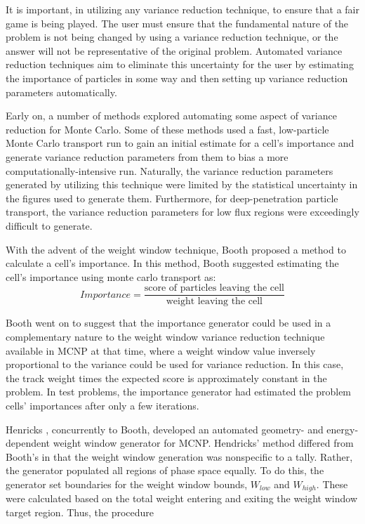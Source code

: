 It is important, in utilizing any variance reduction technique, to ensure that a fair game
is being played. The user must ensure that the fundamental nature of the problem is not 
being changed by using a variance reduction technique, or the answer will not be 
representative of the original problem. Automated variance reduction techniques aim to 
eliminate this uncertainty for the user by estimating the importance of particles in some
 way and then setting up variance reduction parameters automatically. 

Early on, a number of methods explored automating some aspect of variance reduction for 
Monte Carlo. Some of these methods used a fast, low-particle Monte Carlo transport run to gain an initial estimate for a cell's importance and generate variance reduction parameters from them to bias a more computationally-intensive run. Naturally, the variance reduction parameters generated by utilizing this technique were limited by the statistical uncertainty in the figures used to generate them. Furthermore, for deep-penetration particle transport, the variance reduction parameters for low flux regions were exceedingly difficult to generate.  

With the advent of the weight window technique, Booth \cite{booth_automatic_1982} proposed 
a method to calculate a cell's importance. In this method, Booth suggested estimating the cell's importance using monte carlo transport as:
\begin{equation}
Importance  = \frac{\text{score of particles leaving the cell}}{\text{weight leaving the cell}} 
\end{equation}
\label{eq:BoothImp}

Booth went on to suggest that the importance generator could be used in a complementary nature to the weight window variance reduction technique available in MCNP at that time, where a weight window value inversely proportional to the variance could be used for variance reduction.
In this case, the track weight times the expected score is approximately constant in the problem. 
In test problems, the importance generator had estimated the problem cells' importances after only a few iterations. 

Henricks \cite{hendricks_code-generated_1982}, concurrently to Booth, developed an automated geometry- and energy-dependent weight window generator for MCNP. 
Hendricks' method differed from Booth's in that the weight window generation was nonspecific to a tally. 
Rather, the generator populated all regions of phase space equally. 
To do this, the generator set boundaries for the weight window bounds, $W_{low}$ and $W_{high}$. These were calculated based on the total weight entering and exiting the weight window target region. 
Thus, the procedure 

